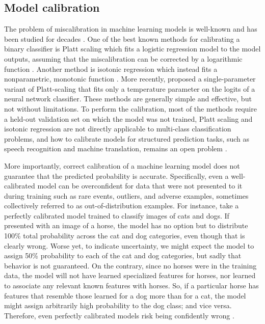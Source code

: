 \subsection{Model calibration} \label{subsec:model-calibration}
% 
The problem of miscalibration in machine learning models is well-known and has been studied for decades \parencite{lewis_sequential_1995, platt_probabilistic_1999, garczarek_classification_2002, zadrozny_transforming_2002, bennett_using_2003, niculescu-mizil_predicting_2005}. One of the best known methods for calibrating a binary classifier is Platt scaling which fits a logistic regression model to the model outputs, assuming that the miscalibration can be corrected by a logarithmic function \parencite{platt_probabilistic_1999}. Another method is isotonic regression which instead fits a nonparametric, monotonic function \parencite{zadrozny_transforming_2002}. 
More recently, \textcite{guo_calibration_2017} proposed a single-parameter variant of Platt-scaling that fits only a temperature parameter on the logits of a neural network classifier. 
These methods are generally simple and effective, but not without limitations. 
To perform the calibration, most of the methods require a held-out validation set on which the model was not trained, Platt scaling and isotonic regression are not directly applicable to multi-class classification problems, and how to calibrate models for structured prediction tasks, such as speech recognition and machine translation, remains an open problem \parencite{astudillo_uncertainty_2010, astudillo_integration_2013, jayashankar_detecting_2020}.

More importantly, correct calibration of a machine learning model does not guarantee that the predicted probability is accurate. 
Specifically, even a well-calibrated model can be overconfident for data that were not presented to it during training such as rare events, outliers, and adverse examples, sometimes collectively referred to as out-of-distribution examples. 
For instance, take a perfectly calibrated model trained to classify images of cats and dogs. If presented with an image of a horse, the model has no option but to distribute 100\% total probability across the cat and dog categories, even though that is clearly wrong. 
Worse yet, to indicate uncertainty, we might expect the model to assign 50\% probability to each of the cat and dog categories, but sadly that behavior is not guaranteed. 
On the contrary, since no horses were in the training data, the model will not have learned specialized features for horses, nor learned to associate any relevant known features with horses. So, if a particular horse has features that resemble those learned for a dog more than for a cat, the model might assign arbitrarily high probability to the dog class; and vice versa. Therefore, even perfectly calibrated models risk being confidently wrong \parencite{zhou_survey_2022}. 


